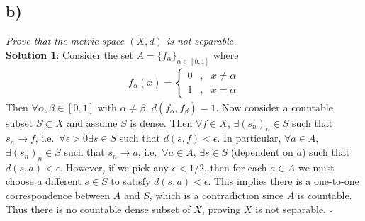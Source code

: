 \documentclass[12pt]{article}
\begin{document}
\subsection*{ b)}
{\it Prove that the metric space $(X, d)$ is not separable.} \\

\noindent\textbf{Solution 1}: Consider the set $A = \{f_{\alpha}\}_{\alpha \in [0,1]}$ where
\begin{align*}
  f_{\alpha}(x) = \left\{\begin{array}{lcl}
    0 &,& x \neq \alpha \\
    1 &,& x = \alpha
  \end{array}\right.
\end{align*}
Then $\forall \alpha,\beta \in [0,1]$ with $\alpha \neq \beta$, $d(f_{\alpha}, f_{\beta}) = 1$.  Now consider a countable subset $S \subset X$ and assume $S$ is dense.  Then $\forall f \in X$, $\exists (s_n)_n \in S$ such that $s_n \rightarrow f$, i.e.~$\forall \epsilon > 0 \exists s\in S$ such that $d(s, f) < \epsilon$.  In particular, $\forall a \in A$, $\exists (s_n)_n \in S$ such that $s_n \rightarrow a$, i.e.~$\forall a \in A$, $\exists s \in S$ (dependent on $a$) such that $d(s, a) < \epsilon$.  However, if we pick any $\epsilon < 1/2$, then for each $a \in A$ we must choose a different $s \in S$ to satisfy $d(s, a) < \epsilon$.  This implies there is a one-to-one correspondence between $A$ and $S$, which is a contradiction since $A$ is countable.  Thus there is no countable dense subset of $X$, proving $X$ is not separable. \hfill $\square$ \\

\end{document}
